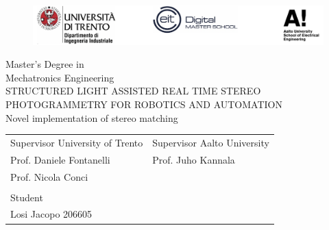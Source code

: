 \documentclass[12pt,a4paper,oneside,pdftex]{report}
\begin{document}




\newpage
\pagestyle{empty}
\begin{figure}[t]
    \centering
    \includegraphics[width=12cm]{images/logo-eit-fronte}
\end{figure}

\vspace*{1.5cm}


\begin{center}
    \large{Master’s Degree in}\\
    \Huge{Mechatronics Engineering}\\
    \vspace*{2.5cm}
    \LARGE{STRUCTURED LIGHT ASSISTED REAL TIME STEREO PHOTOGRAMMETRY FOR ROBOTICS AND AUTOMATION}\\
    \Large{Novel implementation of stereo matching}
\end{center}

\vspace*{3cm}

\begin{table}[h!]
\centering
\begin{tabular}{p{7cm}p{7cm}}
Supervisor University of Trento    & Supervisor Aalto University \\
Prof. Daniele Fontanelli & Prof. Juho Kannala \\
Prof. Nicola Conci & 						   \\
                       &                          \\
                       Student & \\
                       Losi Jacopo 206605
\end{tabular}
\end{table}
\end{document}
